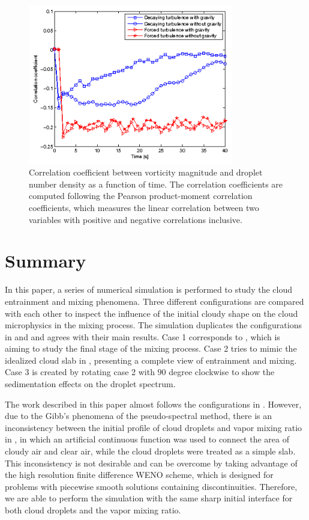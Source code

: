 \begin{figure}\centering
\includegraphics[width=0.8\textwidth]{Figures/correlation} \caption{Correlation
coefficient between vorticity magnitude and droplet number density as a
function of time. The correlation coefficients are computed following the
Pearson product-moment correlation coefficients, which measures the linear
correlation between two variables with positive and negative correlations
inclusive.\label{fig:correlation}} \end{figure}

\section{Summary}
In this paper, a series of numerical simulation is performed to study the cloud
entrainment and mixing phenomena. Three different configurations are compared
with each other to inspect the influence of the initial cloudy shape on the
cloud microphysics in the mixing process. The simulation duplicates the
configurations in \cite{And04} and \cite{Kumar11} and agrees with their main
results. Case 1 corresponds to \cite{And04}, which is aiming to study the final
stage of the mixing process. Case 2 tries to mimic the idealized cloud slab in
\cite{Kumar11}, presenting a complete view of entrainment and mixing. Case 3 is
created by rotating case 2 with $90$ degree clockwise to show the sedimentation
effects on the droplet spectrum.

The work described in this paper almost follows the configurations in
\cite{Kumar11}. However, due to the Gibb's phenomena of the pseudo-spectral
method, there is an inconsistency between the initial profile of cloud droplets
and vapor mixing ratio in \cite{Kumar11}, in which an artificial continuous
function was used to connect the area of cloudy air and clear air, while the
cloud droplets were treated as a simple slab. This inconsistency is not
desirable and can be overcome by taking advantage of the high resolution finite
difference WENO scheme, which is designed for problems with piecewise smooth
solutions containing discontinuities. Therefore, we are able to perform the
simulation with the same sharp initial interface for both cloud droplets and
the vapor mixing ratio.

